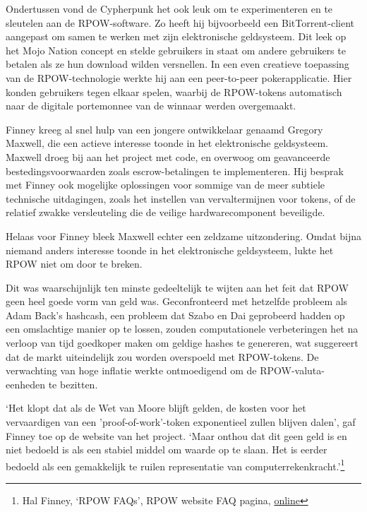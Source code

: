 \documentclass[
  a5paper,
  smalldemyvopaper,11pt,twoside,onecolumn,openright,extrafontsizes]{memoir}
\begin{document}
Ondertussen vond de Cypherpunk het ook leuk om te experimenteren en te
sleutelen aan de RPOW-software. Zo heeft hij bijvoorbeeld een
BitTorrent-client aangepast om samen te werken met zijn elektronische
geldsysteem. Dit leek op het Mojo Nation concept en stelde gebruikers in
staat om andere gebruikers te betalen als ze hun download wilden
versnellen. In een even creatieve toepassing van de RPOW-technologie
werkte hij aan een peer-to-peer pokerapplicatie. Hier konden gebruikers
tegen elkaar spelen, waarbij de RPOW-tokens automatisch naar de digitale
portemonnee van de winnaar werden overgemaakt.

Finney kreeg al snel hulp van een jongere ontwikkelaar genaamd Gregory
Maxwell, die een actieve interesse toonde in het elektronische
geldsysteem. Maxwell droeg bij aan het project met code, en overwoog om
geavanceerde bestedingsvoorwaarden zoals escrow-betalingen te
implementeren. Hij besprak met Finney ook mogelijke oplossingen voor
sommige van de meer subtiele technische uitdagingen, zoals het instellen
van vervaltermijnen voor tokens, of de relatief zwakke versleuteling die
de veilige hardwarecomponent beveiligde.

Helaas voor Finney bleek Maxwell echter een zeldzame uitzondering. Omdat
bijna niemand anders interesse toonde in het elektronische geldsysteem,
lukte het RPOW niet om door te breken.

Dit was waarschijnlijk ten minste gedeeltelijk te wijten aan het feit
dat RPOW geen heel goede vorm van geld was. Geconfronteerd met hetzelfde
probleem als Adam Back's hashcash, een probleem dat Szabo en Dai
geprobeerd hadden op een omslachtige manier op te lossen, zouden
computationele verbeteringen het na verloop van tijd goedkoper maken om
geldige hashes te genereren, wat suggereert dat de markt uiteindelijk
zou worden overspoeld met RPOW-tokens. De verwachting van hoge inflatie
werkte ontmoedigend om de RPOW-valuta-eenheden te bezitten.

`Het klopt dat als de Wet van Moore blijft gelden, de kosten voor het
vervaardigen van een 'proof-of-work'-token exponentieel zullen blijven
dalen', gaf Finney toe op de website van het project. `Maar onthou dat
dit geen geld is en niet bedoeld is als een stabiel middel om waarde op
te slaan. Het is eerder bedoeld als een gemakkelijk te ruilen
representatie van computerrekenkracht.'\footnote{Hal Finney, `RPOW
  FAQs', RPOW website FAQ pagina,
  \href{https://web.archive.org/web/20090217090439/http://rpow.net/faqs.html\#inflation}{online}}
\end{document}
